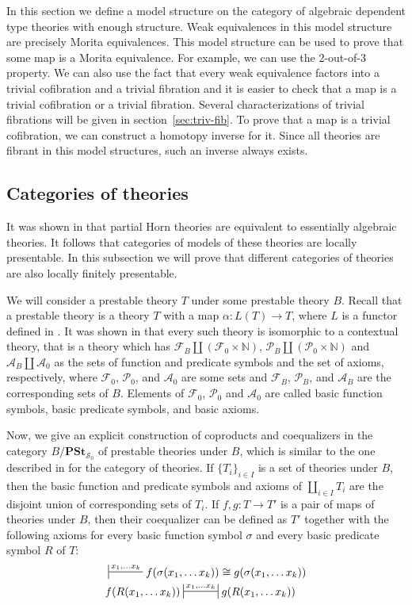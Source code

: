 \documentclass[reqno]{amsart}
\theoremstyle{definition}
\theoremstyle{remark}
\newcommand{\cat}[1]{\mathbf{#1}}
\newcommand{\PSt}{\cat{PSt}}
\numberwithin{figure}{section}
\begin{document}
In this section we define a model structure on the category of algebraic dependent type theories with enough structure.
Weak equivalences in this model structure are precisely Morita equivalences.
This model structure can be used to prove that some map is a Morita equivalence.
For example, we can use the 2-out-of-3 property.
We can also use the fact that every weak equivalence factors into a trivial cofibration and a trivial fibration and it is easier to check that a map is a trivial cofibration or a trivial fibration.
Several characterizations of trivial fibrations will be given in section~\ref{sec:triv-fib}.
To prove that a map is a trivial cofibration, we can construct a homotopy inverse for it.
Since all theories are fibrant in this model structures, such an inverse always exists.

\subsection{Categories of theories}

It was shown in \cite{PHL} that partial Horn theories are equivalent to essentially algebraic theories.
It follows that categories of models of these theories are locally presentable.
In this subsection we will prove that different categories of theories are also locally finitely presentable.

We will consider a prestable theory $T$ under some prestable theory $B$.
Recall that a prestable theory is a theory $T$ with a map $\alpha : L(T) \to T$, where $L$ is a functor defined in \cite{alg-tt}.
It was shown in \cite[Lemma~4.4]{alg-tt} that every such theory is isomorphic to a contextual theory,
that is a theory which has $\mathcal{F}_B \amalg (\mathcal{F}_0 \times \mathbb{N})$,
$\mathcal{P}_B \amalg (\mathcal{P}_0 \times \mathbb{N})$ and $\mathcal{A}_B \amalg \mathcal{A}_0$ as the sets of function and predicate symbols and the set of axioms, respectively,
where $\mathcal{F}_0$, $\mathcal{P}_0$, and $\mathcal{A}_0$ are some sets and $\mathcal{F}_B$, $\mathcal{P}_B$, and $\mathcal{A}_B$ are the corresponding sets of $B$.
Elements of $\mathcal{F}_0$, $\mathcal{P}_0$ and $\mathcal{A}_0$ are called basic function symbols, basic predicate symbols, and basic axioms.

Now, we give an explicit construction of coproducts and coequalizers in the category $B/\PSt_{\mathcal{S}_0}$ of prestable theories under $B$,
which is similar to the one described in \cite[Proposition~2.12]{alg-tt} for the category of theories.
If $\{ T_i \}_{i \in I}$ is a set of theories under $B$, then the basic function and predicate symbols
and axioms of $\coprod_{i \in I} T_i$ are the disjoint union of corresponding sets of $T_i$.
If $f,g : T \to T'$ is a pair of maps of theories under $B$, then their coequalizer can be defined as
$T'$ together with the following axioms for every basic function symbol $\sigma$ and every basic predicate symbol $R$ of $T$:
\begin{align*}
& \sststile{}{x_1, \ldots x_k} f(\sigma(x_1, \ldots x_k)) \cong g(\sigma(x_1, \ldots x_k)) \\
& f(R(x_1, \ldots x_k)) \ssststile{}{x_1, \ldots x_k} g(R(x_1, \ldots x_k))
\end{align*}
\end{document}
